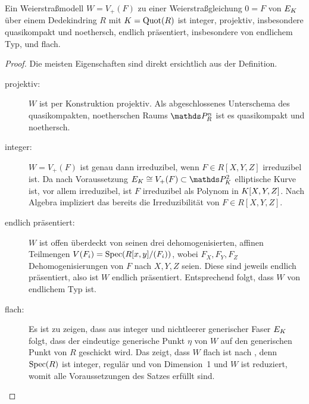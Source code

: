 \begin{Lemma}\label{thm:eigweierstrassmodelle}
  Ein Weierstraßmodell $W=V_+(F)$ zu einer Weierstraßgleichung ${0=F}$
  von $E_{K}$ über einem Dedekindring $R$ mit $K=\operatorname{Quot}(R)$ ist
  integer,
  projektiv, insbesondere quasikompakt und noethersch,
  endlich präsentiert, insbesondere von endlichem Typ, und
  flach.
  \begin{proof}
    Die meisten Eigenschaften sind direkt ersichtlich aus der Definition.
    \begin{description}
    \item[projektiv:] $W$ ist per Konstruktion projektiv. Als
      abgeschlossenes Unterschema des quasikompakten, noetherschen Raums
      $\P_R^n$ ist es quasikompakt und noethersch.
    \item[integer:]
      $W=V_+(F)$ ist genau dann irreduzibel, wenn $F\in R[X,Y,Z]$
      irreduzibel ist.
      Da nach Voraussetzung $E_\K\cong V_+(F)\subset\P_\K^2$
      elliptische Kurve ist, vor allem irreduzibel, ist $F$ irreduzibel
      als Polynom in $K[X,Y,Z]$. Nach Algebra impliziert das bereits
      die Irreduzibilität von $F\in R[X,Y,Z]$.
    \item[endlich präsentiert:]
      $W$ ist offen überdeckt von seinen drei dehomogenisierten,
      affinen Teilmengen $V(F_i)=\operatorname{Spec}(R[x,y]/(F_i))$, wobei $F_X,F_Y,F_Z$
      Dehomogenisierungen von $F$ nach $X,Y,Z$ seien. Diese sind jeweils
      endlich präsentiert, also ist $W$ endlich präsentiert.
      Entsprechend folgt, dass $W$ von endlichem Typ ist.
    \item[flach:]
      Es ist zu zeigen, dass aus integer und nichtleerer generischer
      Faser $E_{K}$ folgt, dass der eindeutige generische Punkt $\eta$
      von $W$ auf den generischen Punkt von $R$ geschickt wird.
      Das zeigt, dass $W$ flach ist
      nach \cite[Proposition~III.9.7]{hartshorne}, denn
      $\operatorname{Spec}(R)$ ist integer, regulär und von Dimension~1 und
      $W$ ist reduziert, womit alle Voraussetzungen des Satzes erfüllt
      sind.
      

\end{description}
\end{proof}
\end{Lemma}
